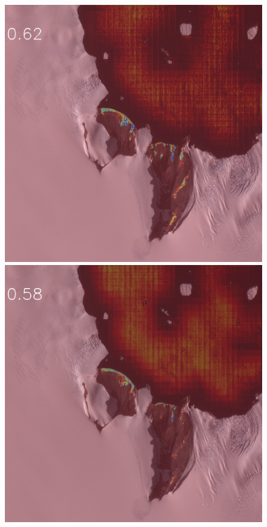 \documentclass[runningheads]{llncs}
\begin{document}
\begin{figure}[h]
\includegraphics[width=\subFigx]{./fig/datagrow/MSE_single_unet_train_0_1.txt_bias-1_bs128_do0.1e25/WV03_20170217064537_10400100297FEA00_17FEB17064537-M1BS-057107305010_01_P001_u08rf3031.png}
\includegraphics[width=\subFigx]{./fig/datagrow/MSE_single_unet_train_0_2.txt_bias-1_bs128_do0.1e25/WV03_20170217064537_10400100297FEA00_17FEB17064537-M1BS-057107305010_01_P001_u08rf3031.png}

\end{figure}
\end{document}
